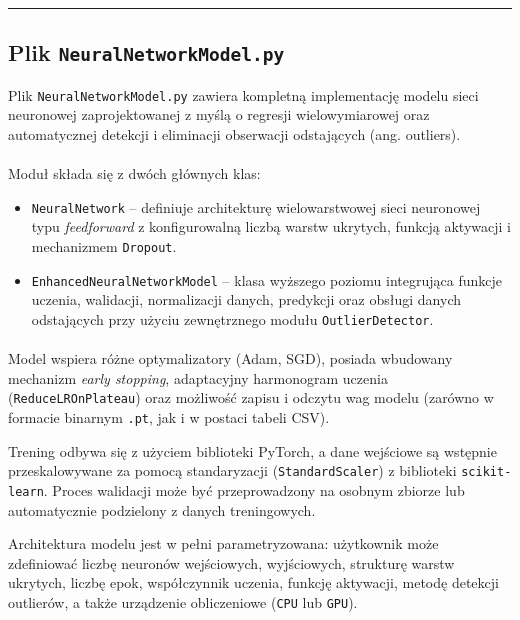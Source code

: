 \documentclass{classrep}
\begin{document}
\noindent\rule{8cm}{0.4pt}

\subsection{Plik \texttt{NeuralNetworkModel.py}}

Plik \texttt{NeuralNetworkModel.py} zawiera kompletną implementację modelu sieci neuronowej zaprojektowanej z myślą o regresji wielowymiarowej oraz automatycznej detekcji i eliminacji obserwacji odstających (ang. outliers).

\paragraph{}
Moduł składa się z dwóch głównych klas:
\begin{itemize}
	\item \texttt{NeuralNetwork} – definiuje architekturę wielowarstwowej sieci neuronowej typu \textit{feedforward} z konfigurowalną liczbą warstw ukrytych, funkcją aktywacji i mechanizmem \texttt{Dropout}.
	\item \texttt{EnhancedNeuralNetworkModel} – klasa wyższego poziomu integrująca funkcje uczenia, walidacji, normalizacji danych, predykcji oraz obsługi danych odstających przy użyciu zewnętrznego modułu \texttt{OutlierDetector}.
\end{itemize}

\paragraph{}
Model wspiera różne optymalizatory (Adam, SGD), posiada wbudowany mechanizm \textit{early stopping}, adaptacyjny harmonogram uczenia (\texttt{ReduceLROnPlateau}) oraz możliwość zapisu i odczytu wag modelu (zarówno w formacie binarnym \texttt{.pt}, jak i w postaci tabeli CSV).

Trening odbywa się z użyciem biblioteki PyTorch, a dane wejściowe są wstępnie przeskalowywane za pomocą standaryzacji (\texttt{StandardScaler}) z biblioteki \texttt{scikit-learn}. Proces walidacji może być przeprowadzony na osobnym zbiorze lub automatycznie podzielony z danych treningowych.

Architektura modelu jest w pełni parametryzowana: użytkownik może zdefiniować liczbę neuronów wejściowych, wyjściowych, strukturę warstw ukrytych, liczbę epok, współczynnik uczenia, funkcję aktywacji, metodę detekcji outlierów, a także urządzenie obliczeniowe (\texttt{CPU} lub \texttt{GPU}).
\end{document}

